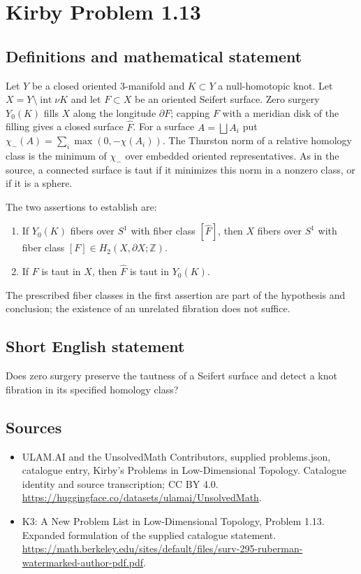 \documentclass[11pt,a4paper]{article}
\begin{document}
\section*{Kirby Problem 1.13}\label{statement}

\subsection{Definitions and mathematical statement}
Let $Y$ be a closed oriented $3$-manifold and $K\subset Y$ a null-homotopic knot.
Let $X=Y\setminus\operatorname{int}\nu K$ and let $F\subset X$ be an oriented
Seifert surface. Zero surgery $Y_0(K)$ fills $X$ along the longitude $\partial F$;
capping $F$ with a meridian disk of the filling gives a closed surface $\widehat F$.
For a surface $A=\bigsqcup A_i$ put $\chi_-(A)=\sum_i\max(0,-\chi(A_i))$.
The Thurston norm of a relative homology class is the minimum of $\chi_-$ over
embedded oriented representatives. As in the source, a connected surface is taut
if it minimizes this norm in a nonzero class, or if it is a sphere.

The two assertions to establish are:
\begin{enumerate}
\item If $Y_0(K)$ fibers over $S^1$ with fiber class $[\widehat F]$, then $X$
fibers over $S^1$ with fiber class $[F]\in H_2(X,\partial X;\mathbb Z)$.
\item If $F$ is taut in $X$, then $\widehat F$ is taut in $Y_0(K)$.
\end{enumerate}
The prescribed fiber classes in the first assertion are part of the hypothesis
and conclusion; the existence of an unrelated fibration does not suffice.
\subsection{Short English statement}
Does zero surgery preserve the tautness of a Seifert surface and detect a knot fibration in its specified homology class?
\subsection{Sources}
\begin{itemize}
\item[S1] ULAM.AI and the UnsolvedMath Contributors, supplied problems.json, catalogue entry, Kirby's Problems in Low-Dimensional Topology. Catalogue identity and source transcription; CC BY 4.0.
\url{https://huggingface.co/datasets/ulamai/UnsolvedMath}.
\item[S2] K3: A New Problem List in Low-Dimensional Topology, Problem 1.13. Expanded formulation of the supplied catalogue statement.
\url{https://math.berkeley.edu/sites/default/files/surv-295-ruberman-watermarked-author-pdf.pdf}.
\end{itemize}
\end{document}
